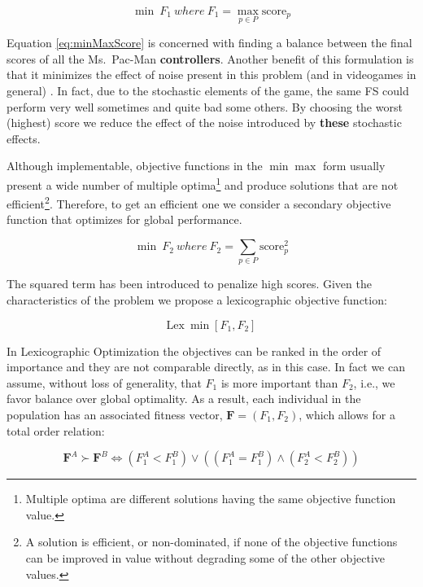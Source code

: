 \documentclass[journal]{IEEEtran}
\begin{document}
\begin{equation}
\label{eq:minMaxScore}
	\min \: F_1 \: where \: F_1 = \max_{p \in P} \text{score}_p
\end{equation}

Equation \eqref{eq:minMaxScore} is concerned with finding a balance between the final scores of all the Ms.\  Pac-Man \textbf{controllers}. Another benefit of this formulation is that it minimizes the effect of noise present in this problem (and in videogames in general) \cite{Mora12}. In fact, due to the stochastic elements of the game, the same FS could perform very well sometimes and quite bad some others. By choosing the worst (highest) score we reduce the effect of the noise introduced by \textbf{these} stochastic effects.

Although implementable, objective functions in the $\min \max$ form usually present a wide number of multiple optima\footnote{Multiple optima are different solutions having the same objective function value.} and produce solutions that are not efficient\footnote{A solution is efficient, or non-dominated, if none of the objective functions can be improved in value without degrading some of the other objective values.}. Therefore, to get an efficient one we consider a secondary objective function that optimizes for global performance.

\begin{equation}
\label{eq:minSquareScore}
	\min \: F_2 \: where \: F_2 = \sum_{p \in P} \text{score}_p^2
\end{equation}

The squared term has been introduced to penalize high scores. Given the characteristics of the problem we propose a lexicographic objective function:

\begin{equation}
\label{eq:lexicographic}
	\text{Lex} \: \min [F_1,F_2]
\end{equation}

In Lexicographic Optimization \cite{Dylan2010} the objectives can be ranked in the order of importance and they are not comparable directly, as in this case. In fact we can assume, without loss of generality, that $F_1$ is more important than $F_2$, i.e., we favor balance over global optimality. As a result, each individual in the population has an associated fitness vector, $\mathbf{F}=(F_1,F_2)$, which allows for a total order relation:

\begin{equation}
\label{eq:ordering}
	\mathbf{F}^A \succ \mathbf{F}^B \iff (F_1^A < F_1^B) \lor ((F_1^A = F_1^B) \land (F_2^A < F_2^B))
\end{equation}
\end{document}
